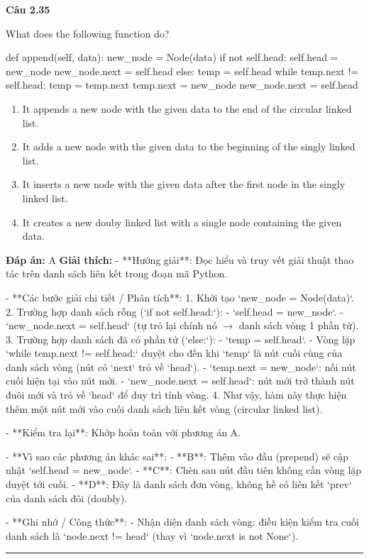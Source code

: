 \documentclass[11pt,a4paper]{article}
\newenvironment{question}[1]{%
  \par\vspace{1em}\noindent\textbf{\large Câu #1}\par\vspace{0.4em}
}{%
  \par\vspace{1em}\hrule\vspace{0.6em}
}
\newenvironment{choices}{%
  \begin{enumerate}[label=\textbf{\Alph*.},leftmargin=2.2em,itemsep=2pt,topsep=3pt]
}{%
  \end{enumerate}
}
\newcommand{\choice}{\item}
\newenvironment{codebox}{%
  \begin{tcolorbox}[colback=gray!8!white,colframe=gray!50!black,arc=1.5mm,boxrule=0.6pt,left=3mm,right=3mm,top=2.5mm,bottom=2.5mm]
  \ttfamily\small
}{%
  \end{tcolorbox}
}
\begin{document}
\begin{question}{2.35}
What does the following function do?
\begin{codebox}
def append(self, data):
    new_node = Node(data)
    if not self.head:
        self.head = new_node
        new_node.next = self.head
    else:
        temp = self.head
        while temp.next != self.head:
            temp = temp.next
        temp.next = new_node
        new_node.next = self.head
\end{codebox}
\begin{choices}
\choice It appends a new node with the given data to the end of the circular linked list.
\choice It adds a new node with the given data to the beginning of the singly linked list.
\choice It inserts a new node with the given data after the first node in the singly linked list.
\choice It creates a new douby linked list with a single node containing the given data.
\end{choices}
\textbf{Đáp án:} A
\textbf{Giải thích:} - **Hướng giải**:
  Đọc hiểu và truy vết giải thuật thao tác trên danh sách liên kết trong đoạn mã Python.

- **Các bước giải chi tiết / Phân tích**:
  1. Khởi tạo `new_node = Node(data)`.
  2. Trường hợp danh sách rỗng (`if not self.head:`):
     - `self.head = new_node`.
     - `new_node.next = self.head` (tự trỏ lại chính nó \(\rightarrow\) danh sách vòng 1 phần tử).
  3. Trường hợp danh sách đã có phần tử (`else:`):
     - `temp = self.head`.
     - Vòng lặp `while temp.next != self.head:` duyệt cho đến khi `temp` là nút cuối cùng của danh sách vòng (nút có `next` trỏ về `head`).
     - `temp.next = new_node`: nối nút cuối hiện tại vào nút mới.
     - `new_node.next = self.head`: nút mới trở thành nút đuôi mới và trỏ về `head` để duy trì tính vòng.
  4. Như vậy, hàm này thực hiện thêm một nút mới vào cuối danh sách liên kết vòng (circular linked list).

- **Kiểm tra lại**:
  Khớp hoàn toàn với phương án A.

- **Vì sao các phương án khác sai**:
  - **B**: Thêm vào đầu (prepend) sẽ cập nhật `self.head = new_node`.
  - **C**: Chèn sau nút đầu tiên không cần vòng lặp duyệt tới cuối.
  - **D**: Đây là danh sách đơn vòng, không hề có liên kết `prev` của danh sách đôi (doubly).

- **Ghi nhớ / Công thức**:
  - Nhận diện danh sách vòng: điều kiện kiểm tra cuối danh sách là `node.next != head` (thay vì `node.next is not None`).
\end{question}
\end{document}
